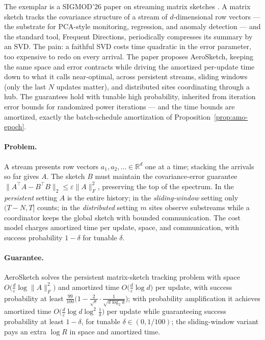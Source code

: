 The exemplar is a SIGMOD'26 paper on streaming matrix sketches
\citep{sigmod26-015}. A matrix sketch tracks the covariance structure of a
stream of $d$-dimensional row vectors --- the substrate for PCA-style
monitoring, regression, and anomaly detection --- and the standard tool,
Frequent Directions, periodically compresses its summary by an SVD. The
pain: a faithful SVD costs time quadratic in the error parameter, too
expensive to redo on every arrival. The paper proposes AeroSketch, keeping
the same space and error contracts while driving the amortized per-update
time down to what it calls near-optimal, across persistent streams,
sliding windows (only the last $N$ updates matter), and distributed sites
coordinating through a hub. The guarantees hold with tunable high
probability, inherited from iteration error bounds for randomized power
iterations --- and the time bounds are amortized, exactly the
batch-schedule amortization of Proposition~\ref{prop:amo-epoch}.

\paragraph{Problem.}
A stream presents row vectors $a_1, a_2, \dots \in \mathbb{R}^d$ one at a
time; stacking the arrivals so far gives $A$. The sketch $B$ must maintain
the covariance-error guarantee $\| A^{\top} A - B^{\top} B \|_2 \le
\varepsilon \|A\|_F^{2}$, preserving the top of the spectrum. In the
\emph{persistent} setting $A$ is the entire history; in the
\emph{sliding-window} setting only $(T-N, T]$ counts; in the
\emph{distributed} setting $m$ sites observe substreams while a
coordinator keeps the global sketch with bounded communication. The cost
model charges amortized time per update, space, and communication, with
success probability $1 - \delta$ for tunable $\delta$.

\paragraph{Guarantee.}

\begin{theorem}
\label{thm:amo-aero}
AeroSketch solves the persistent matrix-sketch tracking problem with space
$O\bigl(\tfrac{d}{\varepsilon} \log \|A\|_F^{2}\bigr)$ and amortized time
$O\bigl(\tfrac{d}{\varepsilon} \log d\bigr)$ per update, with success
probability at least $\tfrac{99}{100}\bigl(1 - \tfrac{2}{\sqrt{e}} \cdot
\tfrac{1}{\sqrt{d \log_2 d}}\bigr)$; with probability amplification it
achieves amortized time $O\bigl(\tfrac{d}{\varepsilon} \log d \log^{2}
\tfrac{1}{\delta}\bigr)$ per update while guaranteeing success probability
at least $1 - \delta$, for tunable $\delta \in (0, 1/100)$; the
sliding-window variant pays an extra $\log R$ in space and amortized
time. \eop
\end{theorem}

